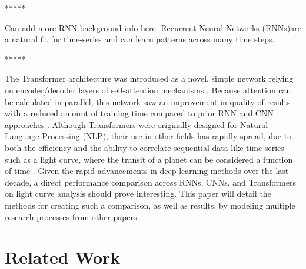 \documentclass[letterpaper]{article} %
\begin{document}
*****

Can add more RNN background info here. Recurrent Neural Networks (RNNs)are a natural fit for time-series and can learn patterns across many time steps.

*****

The Transformer architecture was introduced as a novel, simple network relying on encoder/decoder layers of self-attention mechanisms \cite{vaswani2017attentionneed}. Because attention can be calculated in parallel, this network saw an improvement in quality of results with a reduced amount of training time compared to prior RNN and CNN approaches \cite{vaswani2017attentionneed}. Although Transformers were originally designed for Natural Language Processing (NLP), their use in other fields has rapidly spread, due to both the efficiency and the ability to correlate sequential data like time series such as a light curve, where the transit of a planet can be considered a function of time \cite{salinas2023distinguishingtransitfalsepositives}. Given the rapid advancements in deep learning methods over the last decade, a direct performance comparison across RNNs, CNNs, and Transformers on light curve analysis should prove interesting. This paper will detail the methods for creating such a comparison, as well as results, by modeling multiple research processes from other papers.


\section*{Related Work}
\end{document}
